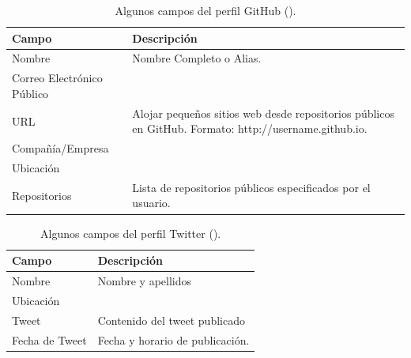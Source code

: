\begin{table}[H]
    \centering
    \begin{tabular}{|p{5cm} p{9cm}|}
    \hline
    \textbf{Campo} & \textbf{Descripción} \\
    \hline \hline
	Nombre & Nombre Completo o Alias.  \\
    \hline

	Correo Electrónico Público & \\
    \hline

	URL & Alojar pequeños sitios web desde repositorios públicos en GitHub. Formato: http://username.github.io.\\
    \hline
	
    Compañía/Empresa & \\
	\hline
    Ubicación & \\
   \hline
   Repositorios & Lista de repositorios públicos especificados por el usuario.\\
   \hline


    \end{tabular}
    
\caption[Campos administrados en GitHub]{Algunos campos del perfil GitHub (\citeyear{fields_github}).}
\label{tabla:Campos GitHub}
\end{table}
 \begin{table}[H]
    \centering
    \begin{tabular}{|p{5cm} p{9cm}|}
    \hline
    \textbf{Campo} & \textbf{Descripción} \\
    \hline \hline
    Nombre & Nombre y apellidos\\ 
    \hline
    Ubicación & \\
    \hline
    Tweet & Contenido del tweet publicado\\
    \hline
	Fecha de Tweet & Fecha y horario de publicación. \\
    \hline
    \end{tabular}
\caption[Campos administrados en Twitter]{Algunos campos del perfil Twitter (\citeyear{fields_twitter}).}
\label{tabla:Campos Twitter}
\end{table}

     

    
